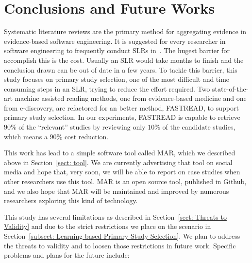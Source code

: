 \documentclass[final,twocolumn,5p]{elsarticle}
\theoremstyle{break}
\begin{document}
\section{Conclusions and Future Works}
\label{sect: Conclusion}

Systematic literature reviews are the primary method for aggregating evidence in evidence-based software engineering. It is suggested for every researcher in software engineering to frequently conduct SLRs in~\cite{keele2007guidelines}. The hugest barrier for accomplish this is the cost. Usually an SLR would take months to finish and the conclusion drawn can be out of date in a few years. To tackle this barrier, this study focuses on primary study selection, one of the most difficult and time consuming steps in an SLR, trying to reduce the effort required. Two state-of-the-art machine assisted reading methods, one from evidence-based medicine and one from e-discovery, are refactored for an better method, FASTREAD, to support primary study selection. In our experiments, FASTREAD is capable to retrieve $90\%$ of the ``relevant'' studies by reviewing only $10\%$ of the candidate studies, which means a $90\%$ cost reduction.

This work has lead to a simple software tool called MAR, which
we described above in Section~\ref{sect: tool}. We are currently advertising
that tool on social media and hope that, very soon,
we will be  able to report on
case studies when other researchers use this tool. MAR is
an open source tool, published in Github, and we also hope
that MAR will be maintained and improved by numerous 
researchers exploring this kind of technology. 

This study has several limitations as described in Section~\ref{sect: Threats to Validity} and due to the strict restrictions we place on the scenario in Section~\ref{subsect: Learning based Primary Study Selection}. We plan to address the threats to validity and to loosen those restrictions in future work. Specific problems and plans for the future include:
\end{document}
